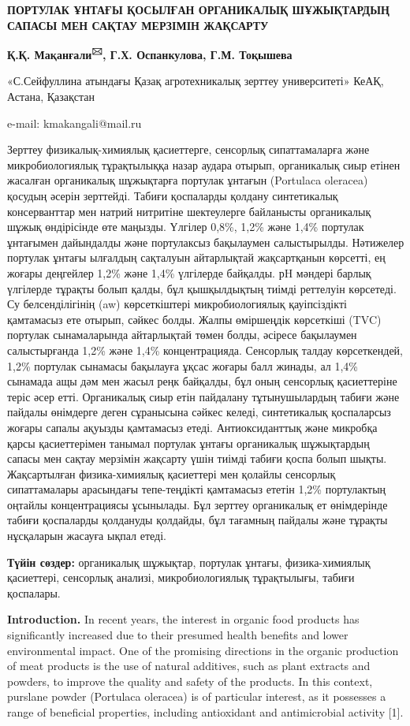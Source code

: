 {\bfseries ПОРТУЛАК ҰНТАҒЫ ҚОСЫЛҒАН ОРГАНИКАЛЫҚ ШҰЖЫҚТАРДЫҢ САПАСЫ МЕН
САҚТАУ МЕРЗІМІН ЖАҚСАРТУ}

{\bfseries Қ.Қ. Мақанғали\textsuperscript{🖂}, Г.Х. Оспанкулова, Г.М.
Тоқышева}

«С.Сейфуллина атындағы Қазақ агротехникалық зерттеу университеті» КеАҚ,
Астана, Қазақстан

e-mail: kmakangali@mail.ru

Зерттеу физикалық-химиялық қасиеттерге, сенсорлық сипаттамаларға және
микробиологиялық тұрақтылыққа назар аудара отырып, органикалық сиыр
етінен жасалған органикалық шұжықтарға портулак ұнтағын (Portulaca
oleracea) қосудың әсерін зерттейді. Табиғи қоспаларды қолдану
синтетикалық консерванттар мен натрий нитритіне шектеулерге байланысты
органикалық шұжық өндірісінде өте маңызды. Үлгілер 0,8\%, 1,2\% және
1,4\% портулак ұнтағымен дайындалды және портулаксыз бақылаумен
салыстырылды. Нәтижелер портулак ұнтағы ылғалдың сақталуын айтарлықтай
жақсартқанын көрсетті, ең жоғары деңгейлер 1,2\% және 1,4\% үлгілерде
байқалды. рH мәндері барлық үлгілерде тұрақты болып қалды, бұл
қышқылдықтың тиімді реттелуін көрсетеді. Су белсенділігінің (aw)
көрсеткіштері микробиологиялық қауіпсіздікті қамтамасыз ете отырып,
сәйкес болды. Жалпы өміршеңдік көрсеткіші (TVC) портулак сынамаларында
айтарлықтай төмен болды, әсіресе бақылаумен салыстырғанда 1,2\% және
1,4\% концентрацияда. Сенсорлық талдау көрсеткендей, 1,2\% портулак
сынамасы бақылауға ұқсас жоғары балл жинады, ал 1,4\% сынамада ащы дәм
мен жасыл реңк байқалды, бұл оның сенсорлық қасиеттеріне теріс әсер
етті. Органикалық сиыр етін пайдалану тұтынушылардың табиғи және пайдалы
өнімдерге деген сұранысына сәйкес келеді, синтетикалық қоспаларсыз
жоғары сапалы ақуызды қамтамасыз етеді. Антиоксиданттық және микробқа
қарсы қасиеттерімен танымал портулак ұнтағы органикалық шұжықтардың
сапасы мен сақтау мерзімін жақсарту үшін тиімді табиғи қоспа болып
шықты. Жақсартылған физика-химиялық қасиеттері мен қолайлы сенсорлық
сипаттамалары арасындағы тепе-теңдікті қамтамасыз ететін 1,2\%
портулактың оңтайлы концентрациясы ұсынылады. Бұл зерттеу органикалық ет
өнімдерінде табиғи қоспаларды қолдануды қолдайды, бұл тағамның пайдалы
және тұрақты нұсқаларын жасауға ықпал етеді.

{\bfseries Түйін сөздер:} органикалық шұжықтар, портулак ұнтағы,
физика-химиялық қасиеттері, сенсорлық анализі, микробиологиялық
тұрақтылығы, табиғи қоспалары.

{\bfseries Introduction.} In recent years, the interest in organic food
products has significantly increased due to their presumed health
benefits and lower environmental impact. One of the promising directions
in the organic production of meat products is the use of natural
additives, such as plant extracts and powders, to improve the quality
and safety of the products. In this context, purslane powder (Portulaca
oleracea) is of particular interest, as it possesses a range of
beneficial properties, including antioxidant and antimicrobial activity
{[}1{]}.

